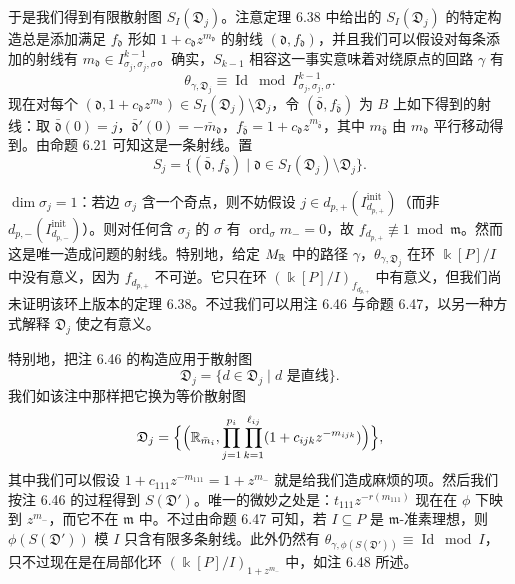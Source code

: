 于是我们得到有限散射图 $S_I(\mathfrak{D}_j)$。注意定理 6.38 中给出的 $S_I(\mathfrak{D}_j)$ 的特定构造总是添加满足 $f_{\mathfrak{d}}$ 形如 $1+c_{\mathfrak{d}}z^{m_{\mathfrak{d}}}$ 的射线 $(\mathfrak{d},f_{\mathfrak{d}})$，并且我们可以假设对每条添加的射线有 $m_{\mathfrak{d}}\in I_{\sigma_j,\sigma_j,\sigma}^{k-1}$。确实，$S_{k-1}$ 相容这一事实意味着对绕原点的回路 $\gamma$ 有
\[
\theta_{\gamma,\mathfrak{D}_j}\equiv\operatorname{Id}\bmod I_{\sigma_j,\sigma_j,\sigma}^{k-1}.
\]
现在对每个 $(\mathfrak{d},1+c_{\mathfrak{d}}z^{m_{\mathfrak{d}}})\in S_I(\mathfrak{D}_j)\setminus\mathfrak{D}_j$，令 $(\bar{\mathfrak{d}},f_{\bar{\mathfrak{d}}})$ 为 $B$ 上如下得到的射线：取 $\bar{\mathfrak{d}}(0)=j$，$\bar{\mathfrak{d}}'(0)=-\bar m_{\mathfrak{d}}$，$f_{\bar{\mathfrak{d}}}=1+c_{\mathfrak{d}}z^{m_{\bar{\mathfrak{d}}}}$，其中 $m_{\bar{\mathfrak{d}}}$ 由 $m_{\mathfrak{d}}$ 平行移动得到。由命题 6.21 可知这是一条射线。置
\begin{equation}
S_j=\{(\bar{\mathfrak{d}},f_{\bar{\mathfrak{d}}})\mid\mathfrak{d}\in S_I(\mathfrak{D}_j)\setminus\mathfrak{D}_j\}.
\tag{6.10}
\end{equation}

$\dim\sigma_j=1$：若边 $\sigma_j$ 含一个奇点，则不妨假设 $j\in d_{p,+}(I_{d_{p,+}}^{\mathrm{init}})$（而非 $d_{p,-}(I_{d_{p,-}}^{\mathrm{init}})$）。则对任何含 $\sigma_j$ 的 $\sigma$ 有 $\operatorname{ord}_\sigma m_-=0$，故 $f_{d_{p,+}}\not\equiv1\bmod\mathfrak{m}$。然而这是唯一造成问题的射线。特别地，给定 $M_{\mathbb{R}}$ 中的路径 $\gamma$，$\theta_{\gamma,\mathfrak{D}_j}$ 在环 $\Bbbk[P]/I$ 中没有意义，因为 $f_{d_{p,+}}$ 不可逆。它只在环 $(\Bbbk[P]/I)_{f_{d_{p,+}}}$ 中有意义，但我们尚未证明该环上版本的定理 6.38。不过我们可以用注 6.46 与命题 6.47，以另一种方式解释 $\mathfrak{D}_j$ 使之有意义。

特别地，把注 6.46 的构造应用于散射图
\[
\mathfrak{D}_j=\{d\in\mathfrak{D}_j\mid d\text{ 是直线}\}.
\]
我们如该注中那样把它换为等价散射图
\[
\mathfrak{D}_j=\Big\{\Big(\mathbb{R}_{\bar m_i},\prod_{j=1}^{p_i}\prod_{k=1}^{\ell_{ij}}(1+c_{ijk}z^{-m_{ijk}})\Big)\Big\},
\]
其中我们可以假设 $1+c_{111}z^{-m_{111}}=1+z^{m_-}$ 就是给我们造成麻烦的项。然后我们按注 6.46 的过程得到 $S(\mathfrak{D}')$。唯一的微妙之处是：$t_{111}z^{-r(m_{111})}$ 现在在 $\phi$ 下映到 $z^{m_-}$，而它不在 $\mathfrak{m}$ 中。不过由命题 6.47 可知，若 $I\subseteq P$ 是 $\mathfrak{m}$-准素理想，则 $\phi(S(\mathfrak{D}'))$ 模 $I$ 只含有限多条射线。此外仍然有 $\theta_{\gamma,\phi(S(\mathfrak{D}'))}\equiv\operatorname{Id}\bmod I$，只不过现在是在局部化环 $(\Bbbk[P]/I)_{1+z^{m_-}}$ 中，如注 6.48 所述。

